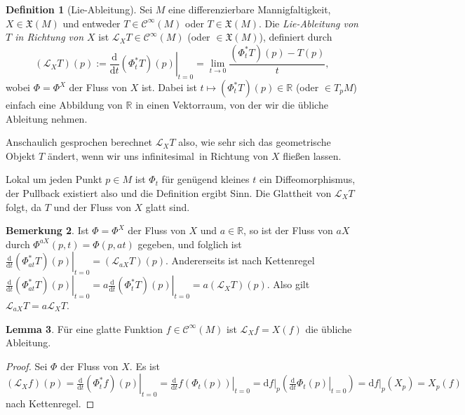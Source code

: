 \documentclass[a4paper]{scrreprt}
\numberwithin{equation}{chapter}
\newcommand{\D}{\mathrm{d}}
\newcommand{\R}{\mathbb{R}}
\newcommand{\sC}{\mathcal{C}^{\infty}}
\theoremstyle{definition}
\newtheorem{defn}{Definition}[section]
\newtheorem{lemma}[defn]{Lemma}
\newtheorem{bem}[defn]{Bemerkung}
\begin{document}
\begin{defn}[Lie-Ableitung]
	Sei $M$ eine differenzierbare Mannigfaltigkeit, $X \in \mathfrak X(M)$ und entweder $T \in \sC(M)$ oder $T \in \mathfrak X(M)$. Die \emph{Lie-Ableitung von $T$ in Richtung von $X$} ist $\mathcal L_X T \in \sC(M)$ (oder $\in \mathfrak X(M)$), definiert durch
	\[(\mathcal L_X T)(p) := \left.\frac{\D}{\D t}(\Phi_t^* T)(p)\right|_{t=0} = \lim_{t\to 0} \frac{(\Phi_t^* T)(p) - T(p)}{t},\]
	wobei $\Phi = \Phi^X$ der Fluss von $X$ ist. Dabei ist $t \mapsto (\Phi_t^*T)(p) \in \mathbb R$ (oder $\in T_pM$) einfach eine Abbildung von $\mathbb R$ in einen Vektorraum, von der wir die übliche Ableitung nehmen.

	Anschaulich gesprochen  berechnet $\mathcal L_X T$ also, wie sehr sich das geometrische Objekt $T$ ändert, wenn wir uns \glqq infinitesimal\grqq\ in Richtung von $X$ fließen lassen.
	
	Lokal um jeden Punkt $p\in M$ ist $\Phi_t$ für genügend kleines $t$ ein Diffeomorphismus, der Pullback existiert also und die Definition ergibt Sinn. Die Glattheit von $\mathcal L_X T$ folgt, da $T$ und der Fluss von $X$ glatt sind.
\end{defn}

\begin{bem}
	Ist $\Phi = \Phi^X$ der Fluss von $X$ und $a\in\R$, so ist der Fluss von $aX$ durch $\Phi^{aX}(p,t) = \Phi(p,at)$ gegeben, und folglich ist $\left.\frac{\D}{\D t} (\Phi_{at}^* T)(p) \right|_{t=0} = (\mathcal L_{aX} T)(p)$. Andererseits ist nach Kettenregel $\left.\frac{\D}{\D t} (\Phi_{at}^* T)(p) \right|_{t=0} = a \left.\frac{\D}{\D t} (\Phi_t^* T)(p) \right|_{t=0} = a (\mathcal L_X T)(p)$. Also gilt $\mathcal L_{aX} T = a \mathcal L_X T$.
\end{bem}

\begin{lemma} \label{lemma:lie_abl_funk}
	Für eine glatte Funktion $f \in \sC(M)$ ist $\mathcal L_X f = X(f)$ die übliche Ableitung.

	\begin{proof}
		Sei $\Phi$ der Fluss von $X$. Es ist $(\mathcal L_X f)(p) = \left.\frac{\D}{\D t}(\Phi_t^* f)(p)\right|_{t=0}  = \left.\frac{\D}{\D t}f(\Phi_t(p))\right|_{t=0} = \left.\D f\right|_p \left( \left.\frac{\D}{\D t}\Phi_t(p)\right|_{t=0} \right) = \left.\D f\right|_p (X_p) = X_p(f)$ nach Kettenregel.
	\end{proof}
\end{lemma}
\end{document}
